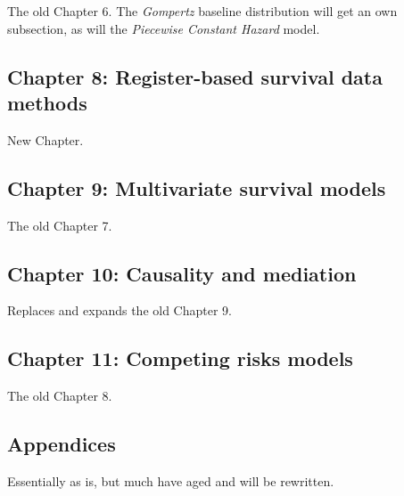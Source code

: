 \documentclass[a4paper,11pt]{article}
\begin{document}
The old Chapter 6. The \emph{Gompertz} baseline distribution will get an
own subsection, as will the \emph{Piecewise Constant Hazard} model.

\subsection*{Chapter 8: Register-based survival data methods}

New Chapter.

\subsection*{Chapter 9: Multivariate survival models}

The old Chapter 7.

\subsection*{Chapter 10: Causality and mediation}

Replaces and expands the old Chapter 9.

\subsection*{Chapter 11: Competing risks models}

The old Chapter 8.

\subsection*{Appendices}

Essentially as is, but much have aged and will be rewritten.


\end{document}
